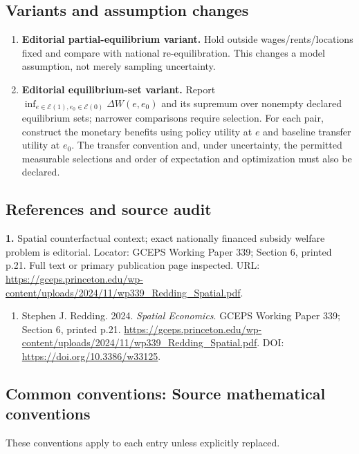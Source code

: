 \documentclass[11pt,a4paper]{article}
\begin{document}
\subsection*{Variants and assumption changes}
\begin{enumerate}
\item \textbf{Editorial partial-equilibrium variant.} Hold outside wages/rents/locations fixed and compare with national re-equilibration. This changes a model assumption, not merely sampling uncertainty.
\item \textbf{Editorial equilibrium-set variant.} Report \(\inf_{e\in\mathcal E(1),e_0\in\mathcal E(0)}\Delta W(e,e_0)\) and its supremum over nonempty declared equilibrium sets; narrower comparisons require selection. For each pair, construct the monetary benefits using policy utility at \(e\) and baseline transfer utility at \(e_0\). The transfer convention and, under uncertainty, the permitted measurable selections and order of expectation and optimization must also be declared.
\end{enumerate}
\subsection*{References and source audit}
\textbf{1.} Spatial counterfactual context; exact nationally financed subsidy welfare problem is editorial. Locator: GCEPS Working Paper 339; Section 6, printed p.21. Full text or primary publication page inspected. URL: \url{https://gceps.princeton.edu/wp-content/uploads/2024/11/wp339_Redding_Spatial.pdf}.
\begin{enumerate}\raggedright
\item\hypertarget{definitions:source:30007749:1}{} Stephen J. Redding. 2024. \emph{Spatial Economics}. GCEPS Working Paper 339; Section 6, printed p.21.
\url{https://gceps.princeton.edu/wp-content/uploads/2024/11/wp339_Redding_Spatial.pdf}.
DOI: \url{https://doi.org/10.3386/w33125}.
\end{enumerate}

\subsection*{Common conventions: Source mathematical conventions}

These conventions apply to each entry unless explicitly replaced.
\end{document}
